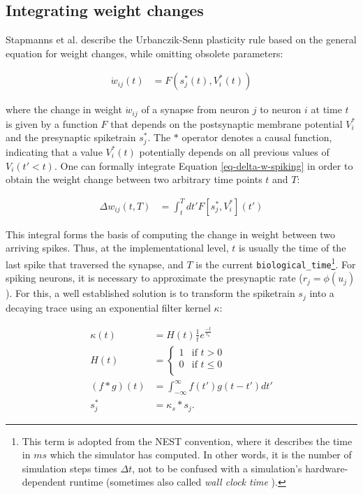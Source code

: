 \subsection{Integrating weight changes}


Stapmanns et al. describe the Urbanczik-Senn plasticity rule based on the general equation for weight changes, while
omitting obsolete parameters:

\begin{align}
  \dot{w}_{ij}(t) & = F(s_j^\ast (t), V_i^\ast (t)) \label{eq-delta-w-spiking}
\end{align}

where the change in weight $\dot{w}_{ij}$ of a synapse from neuron $j$ to neuron $i$ at time $t$ is given by a function
$F$ that depends on the postsynaptic membrane potential $V_i^\ast$ and the presynaptic spiketrain $s_j^\ast$. The $\ast$
operator denotes a causal function, indicating that a value $V_i^\ast(t)$ potentially depends on all previous values of
$V_i(t' < t)$. One can formally integrate Equation \ref{eq-delta-w-spiking} in order to obtain the weight change between
two arbitrary time points $t$ and $T$:

\begin{align}
  \Delta w_{ij}(t,T) & = \int_t^T dt' F[s_j^\ast, V_i^\ast](t') \label{eq-delta-w-t-T}
\end{align}

This integral forms the basis of computing the change in weight between two arriving spikes. Thus, at the
implementational level, $t$ is usually the time of the last spike that traversed the synapse, and $T$ is the current
\texttt{biological\_time}\footnote{This term is adopted from the NEST convention, where it describes the time in $ms$
which the simulator has computed. In other words, it is the number of simulation steps times $\Delta t$, not to be
confused with a simulation's hardware-dependent runtime (sometimes also called \textit{wall clock time}
\citep{albada2018performance}). }. For spiking neurons, it is necessary to approximate the presynaptic rate
($r_j=\phi(u_j)$). For this, a well established solution is to transform the spiketrain $s_j$ into a decaying trace
using an exponential filter kernel $\kappa$:

\begin{align}
  \kappa(t)     & = H(t) \frac{1}{t}e^{\frac{-t}{\tau_{\kappa}}}                        \\
  H(t)          & =
  \begin{cases}
    1 & \text{if $t > 0$}    \\
    0 & \text{if $t \leq 0$} \\
  \end{cases}                                                              \\
  (f \ast g)(t) & = \int_{- \infty }^{\infty} f(t') g(t-t') d t' \label{eq-convolution} \\
  s_j^\ast      & = \kappa_s \ast s_j. \label{eq-spike-trace}
\end{align}

